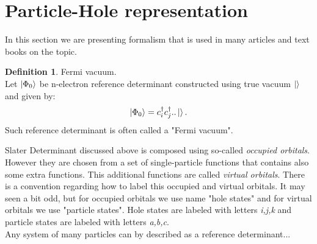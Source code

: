 \documentclass[twoside,english]{uiofysmaster}
\theoremstyle{definition}
\newtheorem{defn}{Definition}
\begin{document}
\section{Particle-Hole representation}
In this section we are presenting formalism that is used in many articles and text books on the topic.\\

\begin{defn}Fermi vacuum.\\
	Let $\ket{\Phi_0}$ be n-electron reference determinant constructed using true vacuum $\ket{}$ and given by:
	\[ \ket{\Phi_0} = c^\dagger_i c^\dagger_j ..\ket{}. \]
	Such reference determinant is often called a "Fermi vacuum".
\end{defn}



Slater Determinant discussed above is composed using so-called \textit{occupied orbitals}. However they are chosen from a set of single-particle functions that contains also some extra functions. This additional functions are called \textit{virtual orbitals}. There is a convention regarding how to label this occupied and virtual orbitals. It may seen a bit odd, but for occupied orbitals we use name "hole states" and for virtual orbitals we use "particle states". Hole states are labeled with letters \textit{i,j,k} and particle states are labeled with letters \textit{a,b,c}.\\


Any system of many particles can by described as a reference determinant...

 
\end{document}
